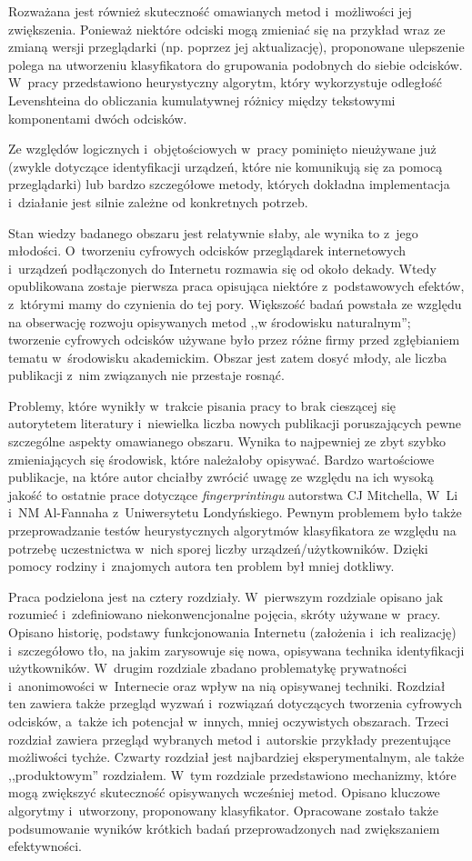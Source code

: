 Rozważana jest również skuteczność omawianych metod i~możliwości jej
zwiększenia. Ponieważ niektóre odciski mogą zmieniać się na przykład wraz ze
zmianą wersji przeglądarki (np. poprzez jej aktualizację), proponowane
ulepszenie polega na utworzeniu klasyfikatora do grupowania podobnych do siebie
odcisków. W~pracy przedstawiono heurystyczny algorytm, który wykorzystuje
odległość Levenshteina do obliczania kumulatywnej różnicy między tekstowymi
komponentami dwóch odcisków.

Ze względów logicznych i~objętościowych w~pracy pominięto nieużywane już (zwykle
dotyczące identyfikacji urządzeń, które nie komunikują się za pomocą
przeglądarki) lub bardzo szczegółowe metody, których dokładna implementacja
i~działanie jest silnie zależne od konkretnych potrzeb.

Stan wiedzy badanego obszaru jest relatywnie słaby, ale wynika to z~jego
młodości. O~tworzeniu cyfrowych odcisków przeglądarek internetowych i~urządzeń
podłączonych do Internetu rozmawia się od około dekady. Wtedy opublikowana
zostaje pierwsza praca opisująca niektóre z~podstawowych efektów, z~którymi mamy
do czynienia do tej pory. Większość badań powstała ze względu na obserwację
rozwoju opisywanych metod ,,w środowisku naturalnym''; tworzenie cyfrowych
odcisków używane było przez różne firmy przed zgłębianiem tematu w~środowisku
akademickim. Obszar jest zatem dosyć młody, ale liczba publikacji z~nim
związanych nie przestaje rosnąć.

Problemy, które wynikły w~trakcie pisania pracy to brak cieszącej się
autorytetem literatury i~niewielka liczba nowych publikacji poruszających pewne
szczególne aspekty omawianego obszaru. Wynika to najpewniej ze zbyt szybko
zmieniających się środowisk, które należałoby opisywać. Bardzo wartościowe
publikacje, na które autor chciałby zwrócić uwagę ze względu na ich wysoką
jakość to ostatnie prace dotyczące \emph{fingerprintingu} autorstwa CJ
Mitchella, W~Li i~NM Al-Fannaha z~Uniwersytetu Londyńskiego. Pewnym problemem
było także przeprowadzanie testów heurystycznych algorytmów klasyfikatora ze
względu na potrzebę uczestnictwa w~nich sporej liczby urządzeń/użytkowników.
Dzięki pomocy rodziny i~znajomych autora ten problem był mniej dotkliwy.

Praca podzielona jest na cztery rozdziały. W~pierwszym rozdziale opisano jak
rozumieć i~zdefiniowano niekonwencjonalne pojęcia, skróty używane w~pracy.
Opisano historię, podstawy funkcjonowania Internetu (założenia i~ich realizację)
i~szczegółowo tło, na jakim zarysowuje się nowa, opisywana technika
identyfikacji użytkowników. W~drugim rozdziale zbadano problematykę prywatności
i~anonimowości w~Internecie oraz wpływ na nią opisywanej techniki. Rozdział ten
zawiera także przegląd wyzwań i~rozwiązań dotyczących tworzenia cyfrowych
odcisków, a~także ich potencjał w~innych, mniej oczywistych obszarach. Trzeci
rozdział zawiera przegląd wybranych metod i~autorskie przykłady prezentujące
możliwości tychże. Czwarty rozdział jest najbardziej eksperymentalnym, ale także
,,produktowym'' rozdziałem. W~tym rozdziale przedstawiono mechanizmy, które mogą
zwiększyć skuteczność opisywanych wcześniej metod. Opisano kluczowe algorytmy
i~utworzony, proponowany klasyfikator. Opracowane zostało także podsumowanie
wyników krótkich badań przeprowadzonych nad zwiększaniem efektywności.
